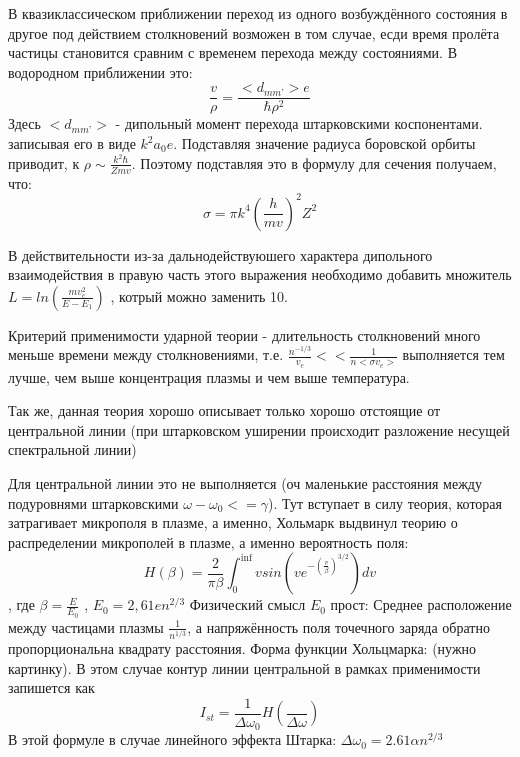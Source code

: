 \documentclass[10pt, a4paper]{article}
\begin{document}
В квазиклассическом приближении переход из одного возбуждённого состояния в другое под действием столкновений возможен в том случае, есди время пролёта частицы становится сравним с временем перехода между состояниями. В водородном приближении это:
\begin{equation}
	\frac{v}{\rho}=\frac{<d_{m m’}> e}{\hbar \rho^2}
\end{equation}
Здесь $<d_{m m’}>$ - дипольный момент перехода штарковскими коспонентами. записывая его в виде $k^2 a_{0} e$.
Подставляя значение радиуса боровской орбиты приводит, к $\rho \sim \frac{k^2 \hbar}{Zmv}$. Поэтому подставляя это в формулу для сечения получаем, что:
\begin{equation}
	\sigma = \pi k^4 (\frac{h}{mv})^2 Z^2
\end{equation}

В действительности из-за дальнодействуюшего характера дипольного взаимодействия в правую часть этого выражения необходимо добавить множитель $L= ln(\frac{m v_e^{2}}{E-E_1})$ , котрый можно заменить 10.

Критерий применимости ударной теории - длительность столкновений много меньше времени между столкновениями, т.е. $\frac{n^{-1/3}}{v_e} << \frac{1}{n <\sigma v_e>} $ выполняется тем лучше, чем выше концентрация плазмы и чем выше температура.

Так же, данная теория хорошо описывает только хорошо отстоящие от центральной линии (при штарковском уширении происходит разложение несущей спектральной линии)

Для центральной линии это не выполняется (оч маленькие расстояния между подуровнями штарковскими $\omega - \omega_0 <= \gamma$).
Тут вступает в силу теория, которая затрагивает микрополя в плазме, а именно, Хольмарк выдвинул теорию о распределении микрополей в плазме, а именно вероятность поля:
\begin{equation}
	H( \beta ) = \frac{2}{\pi \beta} \int_{0}^{\inf} v sin(v e^{- (\frac{v}{\beta})^{3/2}}) dv
\end{equation}
, где $\beta = \frac{E}{E_0}$ , $E_0 = 2,61 e n^{2/3}$ 
Физический смысл $E_0$ прост: Среднее расположение между частицами плазмы $\frac{1}{n^{1/3}} $, а напряжённость поля точечного заряда обратно пропорциональна квадрату расстояния. Форма функции Хольцмарка:
(нужно картинку).
В этом случае контур линии центральной в рамках применимости запишется как 
\begin{equation}
	I_{st}=\frac{1}{\Delta \omega_0} H(\frac{}{\Delta \omega})
\end{equation}
В этой формуле в случае линейного эффекта Штарка: $\Delta \omega_0 = 2.61 \alpha n^{2/3}$
\end{document}

